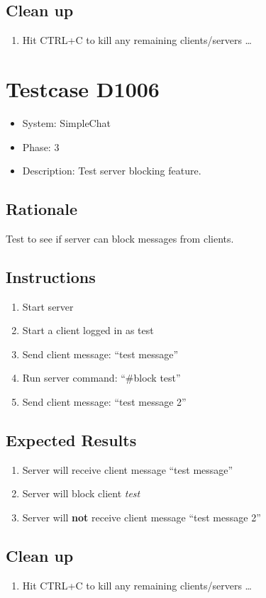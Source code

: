 \documentclass[12pt]{article}
\begin{document}
\subsection*{Clean up}
\begin{enumerate}
\item Hit CTRL+C to kill any remaining clients/servers \dots
\end{enumerate}


\section{Testcase D1006}
\begin{itemize}
\item System: SimpleChat
\item Phase: 3
\item Description: Test server blocking feature.
\end{itemize}

\subsection*{Rationale}
Test to see if server can block messages from clients.

\subsection*{Instructions}
\begin{enumerate}
\item Start server
\item Start a client logged in as test
\item Send client message: ``test message''
\item Run server command: ``\#block test''
\item Send client message: ``test message 2''
\end{enumerate}

\subsection*{Expected Results}
\begin{enumerate}
\item Server will receive client message ``test message''
\item Server will block client \emph{test}
\item Server will \textbf{not} receive client message ``test message 2''
\end{enumerate}

\subsection*{Clean up}
\begin{enumerate}
\item Hit CTRL+C to kill any remaining clients/servers \dots
\end{enumerate}
\end{document}

